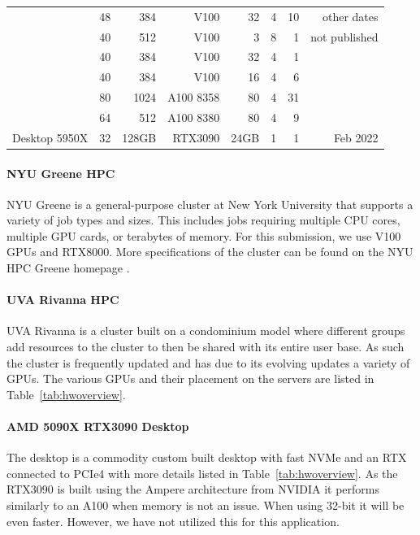 \documentclass[sigplan,screen]{acmart}
\begin{document}
\begin{table}[htb]
\begin{center}
\begin{tabular}{|l|r|r|r|r|r|r|r|}
	        & 48	& 384	& V100 	    & 32	& 4	& 10 & other dates \\
	        & 40	& 512	& V100 	    & 3     & 8 & 1  & not published \\
	        & 40	& 384	& V100 	    & 32    & 4	& 1  & \\
	        & 40	& 384	& V100 	    & 16    & 4	& 6  & \\
	        & 80	& 1024	& A100  8358	& 80    & 4 & 31 & \\
	        & 64	& 512	& A100  8380	& 80    & 4 & 9  & \\

         \hline
         Desktop 5950X     &  32 & 128GB     & RTX3090   & 24GB    & 1 & 1 & Feb 2022   \\
         \hline
    \end{tabular}
    \end{center}

\end{table}

\paragraph{NYU Greene HPC} NYU Greene is a general-purpose cluster at New York University that supports a variety of job types and sizes. This includes jobs requiring multiple CPU cores, multiple GPU cards, or terabytes of memory. For this submission, we use V100 GPUs and RTX8000. More specifications of the cluster can be found on the NYU HPC Greene homepage \cite{www-greene}.

\paragraph{UVA Rivanna HPC} UVA Rivanna is a cluster built on a condominium model where different groups add resources to the cluster to then be shared with its entire user base. As such the cluster is frequently updated and has due to its evolving updates a variety of GPUs. The various GPUs and their placement on the servers are listed in Table~\ref{tab:hwoverview}.

\paragraph{AMD 5090X RTX3090 Desktop} The desktop is a commodity custom built desktop with fast NVMe and an RTX connected to PCIe4 with more details listed in Table~\ref{tab:hwoverview}. As the RTX3090 is built using the Ampere architecture from NVIDIA it performs similarly to an A100 when memory is not an issue. When using 32-bit it will be even faster. However, we have not utilized this for this application.
\end{document}
